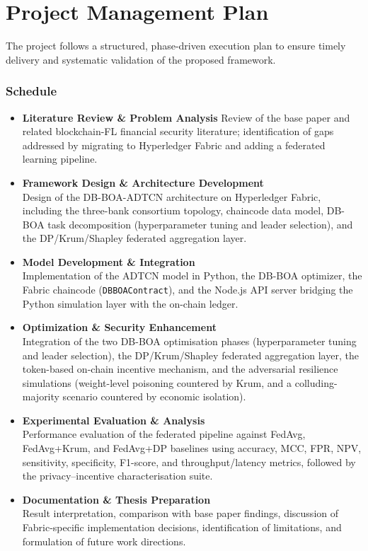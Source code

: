 \section{Project Management Plan}
The project follows a structured, phase-driven execution plan to ensure timely delivery and systematic validation of the proposed framework.

\subsubsection*{Schedule}

\begin{itemize}
\item \textbf{Literature Review \& Problem Analysis}
Review of the base paper \cite{prabanand2025} and related blockchain-FL financial security literature; identification of gaps addressed by migrating to Hyperledger Fabric and adding a federated learning pipeline.


\item \textbf{Framework Design \& Architecture Development} \\
Design of the DB-BOA-ADTCN architecture on Hyperledger Fabric, including the three-bank consortium topology, chaincode data model, DB-BOA task decomposition (hyperparameter tuning and leader selection), and the DP/Krum/Shapley federated aggregation layer.

\item \textbf{Model Development \& Integration} \\
Implementation of the ADTCN model in Python, the DB-BOA optimizer, the Fabric chaincode (\texttt{DBBOAContract}), and the Node.js API server bridging the Python simulation layer with the on-chain ledger.

\item \textbf{Optimization \& Security Enhancement} \\
Integration of the two DB-BOA optimisation phases (hyperparameter tuning and leader selection), the DP/Krum/Shapley federated aggregation layer, the token-based on-chain incentive mechanism, and the adversarial resilience simulations (weight-level poisoning countered by Krum, and a colluding-majority scenario countered by economic isolation).

\item \textbf{Experimental Evaluation \& Analysis} \\
Performance evaluation of the federated pipeline against FedAvg, FedAvg+Krum, and FedAvg+DP baselines using accuracy, MCC, FPR, NPV, sensitivity, specificity, F1-score, and throughput/latency metrics, followed by the privacy--incentive characterisation suite.

\item \textbf{Documentation \& Thesis Preparation} \\
Result interpretation, comparison with base paper findings, discussion of Fabric-specific implementation decisions, identification of limitations, and formulation of future work directions.
\end{itemize}


